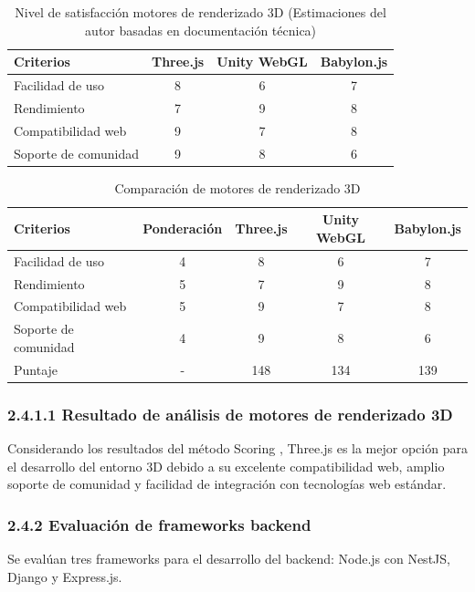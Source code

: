 \begin{table}[ht]
\centering
\caption{Nivel de satisfacción motores de renderizado 3D (Estimaciones del autor basadas en documentación técnica)}
\begin{tabular}{l c c c}
\hline
Criterios & Three.js & Unity WebGL & Babylon.js \\
\hline
Facilidad de uso & 8 & 6 & 7 \\
Rendimiento & 7 & 9 & 8 \\
Compatibilidad web & 9 & 7 & 8 \\
Soporte de comunidad & 9 & 8 & 6 \\
\hline
\end{tabular}
\end{table}
\FloatBarrier

\begin{table}[ht]
\centering
\caption{Comparación de motores de renderizado 3D}
\begin{tabular}{l c c c c}
\hline
Criterios & Ponderación & Three.js & Unity WebGL & Babylon.js \\
\hline
Facilidad de uso & 4 & 8 & 6 & 7 \\
Rendimiento & 5 & 7 & 9 & 8 \\
Compatibilidad web & 5 & 9 & 7 & 8 \\
Soporte de comunidad & 4 & 9 & 8 & 6 \\
\hline
Puntaje & - & 148 & 134 & 139 \\
\hline
\end{tabular}
\end{table}
\FloatBarrier
\subsubsection{2.4.1.1 Resultado de análisis de motores de renderizado 3D}
Considerando los resultados del método Scoring \cite{belton2002}, Three.js \cite{threejs2023} es la mejor opción para el desarrollo del entorno 3D debido a su excelente compatibilidad web, amplio soporte de comunidad y facilidad de integración con tecnologías web estándar.

\subsubsection{2.4.2 Evaluación de frameworks backend}
Se evalúan tres frameworks para el desarrollo del backend: Node.js con NestJS, Django y Express.js.

